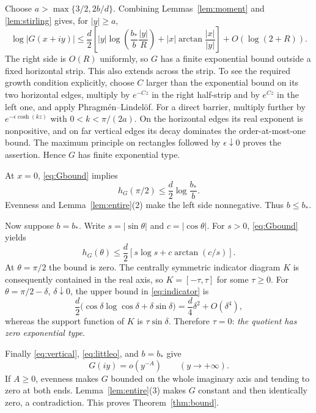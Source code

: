 \documentclass[11pt]{article}
\theoremstyle{remark}\newtheorem{remark}[theorem]{Remark}
\begin{document}
Choose $a>\max\{3/2,2b/d\}$. Combining Lemmas~\ref{lem:moment} and \ref{lem:stirling} gives, for $|y|\ge a$,
\begin{equation}\label{eq:Gbound}
 \log|G(x+iy)|\le
 \frac d2\left[|y|\log\left(\frac{b_*}{b}\frac{|y|}{R}\right)
 +|x|\arctan\frac{|x|}{|y|}\right]+O(\log(2+R)).
\end{equation}
The right side is $O(R)$ uniformly, so $G$ has a finite exponential bound outside a fixed horizontal strip. This also extends across the strip. To see the required growth condition explicitly, choose $C$ larger than the exponential bound on its two horizontal edges, multiply by $e^{-Cz}$ in the right half-strip and by $e^{Cz}$ in the left one, and apply Phragm\'en--Lindel\"of. For a direct barrier, multiply further by $e^{-\epsilon\cosh(kz)}$ with $0<k<\pi/(2a)$. On the horizontal edges its real exponent is nonpositive, and on far vertical edges its decay dominates the order-at-most-one bound. The maximum principle on rectangles followed by $\epsilon\downarrow0$ proves the assertion. Hence $G$ has finite exponential type.

At $x=0$, \eqref{eq:Gbound} implies
\[
 h_G(\pi/2)\le\frac d2\log\frac{b_*}{b}.
\]
Evenness and Lemma~\ref{lem:entire}(2) make the left side nonnegative. Thus $b\le b_*$.

Now suppose $b=b_*$. Write $s=|\sin\theta|$ and $c=|\cos\theta|$. For $s>0$, \eqref{eq:Gbound} yields
\begin{equation}\label{eq:indicator}
 h_G(\theta)\le\frac d2\left[s\log s+c\arctan(c/s)\right].
\end{equation}
At $\theta=\pi/2$ the bound is zero. The centrally symmetric indicator diagram $K$ is consequently contained in the real axis, so $K=[-\tau,\tau]$ for some $\tau\ge0$. For $\theta=\pi/2-\delta$, $\delta\downarrow0$, the upper bound in \eqref{eq:indicator} is
\[
 \frac d2\bigl(\cos\delta\log\cos\delta+\delta\sin\delta\bigr)
 =\frac d4\delta^2+O(\delta^4),
\]
whereas the support function of $K$ is $\tau\sin\delta$. Therefore $\tau=0$: \emph{the quotient has zero exponential type}.

Finally \eqref{eq:vertical}, \eqref{eq:littleo}, and $b=b_*$ give
\begin{equation}\label{eq:Gdecay}
 G(iy)=o(y^{-A})\qquad(y\to+\infty).
\end{equation}
If $A\ge0$, evenness makes $G$ bounded on the whole imaginary axis and tending to zero at both ends. Lemma~\ref{lem:entire}(3) makes $G$ constant and then identically zero, a contradiction. This proves Theorem~\ref{thm:bound}.
\end{document}
